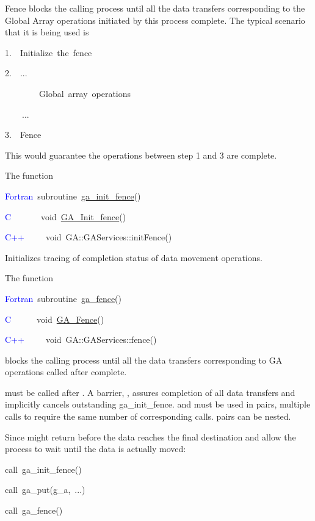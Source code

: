 Fence blocks the calling process until all the data transfers corresponding
to the Global Array operations initiated by this process complete.
The typical scenario that it is being used is
\begin{lyxcode}
1.~~Initialize~the~fence~

2.~~...~

~~~~~~~~Global~array~operations~

~~~~...~

3.~~Fence
\end{lyxcode}
This would guarantee the operations between step 1 and 3 are complete.

The function
\begin{lyxcode}
\textcolor{blue}{Fortran}~subroutine~\href{http://www.emsl.pnl.gov/docs/global/ga_ops.html\#ga_init_fence}{ga\_{}init\_{}fence}()~

\textcolor{blue}{C}~~~~~~~void~\href{http://www.emsl.pnl.gov/docs/global/c_nga_ops.html\#ga_init_fence}{GA\_{}Init\_{}fence}()~

\textcolor{blue}{C++}~~~~~void~GA::GAServices::initFence()
\end{lyxcode}
Initializes tracing of completion status of data movement operations.

The function
\begin{lyxcode}
\textcolor{blue}{Fortran}~subroutine~\href{http://www.emsl.pnl.gov/docs/global/ga_ops.html\#ga_fence}{ga\_{}fence}()~

\textcolor{blue}{C}\textcolor{blue}{\underbar{~}}~~~~~~void~\href{http://www.emsl.pnl.gov/docs/global/c_nga_ops.html\#ga_fence}{GA\_{}Fence}()~

\textcolor{blue}{C++}~~~~~void~GA::GAServices::fence()
\end{lyxcode}
blocks the calling process until all the data transfers corresponding
to GA operations called after \texttt{} complete.

\texttt{} must be called after \texttt{}.
A barrier, \texttt{}, assures completion of all data
transfers and implicitly cancels outstanding ga\_init\_fence. \texttt{}
and \texttt{} must be used in pairs, multiple calls
to \texttt{} require the same number of corresponding
\texttt{} calls. \texttt{}
pairs can be nested.

\textit{}

Since \texttt{} might return before the data reaches
the final destination \texttt{} and \texttt{}
allow the process to wait until the data is actually moved:
\begin{lyxcode}
call~ga\_init\_fence()~

call~ga\_put(g\_a,~...)~

call~ga\_fence()
\end{lyxcode}
\textit{}

